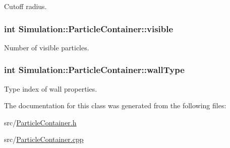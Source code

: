 Cutoff radius. 

\hypertarget{classSimulation_1_1ParticleContainer_a3e3805eea543d96c5cf6ced07b9c2e7b}{
\subsubsection[{visible}]{\setlength{\rightskip}{0pt plus 5cm}int Simulation\-::\-Particle\-Container\-::visible\hspace{0.3cm}{\ttfamily [private]}}}\label{classSimulation_1_1ParticleContainer_a3e3805eea543d96c5cf6ced07b9c2e7b}


Number of visible particles. 

\hypertarget{classSimulation_1_1ParticleContainer_a257c23a232693610d47c0ee082085a49}{
\subsubsection[{wall\-Type}]{\setlength{\rightskip}{0pt plus 5cm}int Simulation\-::\-Particle\-Container\-::wall\-Type\hspace{0.3cm}{\ttfamily [private]}}}\label{classSimulation_1_1ParticleContainer_a257c23a232693610d47c0ee082085a49}


Type index of wall properties. 



The documentation for this class was generated from the following files\-:\begin{DoxyCompactItemize}
\item 
src/\hyperlink{ParticleContainer_8h}{Particle\-Container.\-h}\item 
src/\hyperlink{ParticleContainer_8cpp}{Particle\-Container.\-cpp}\end{DoxyCompactItemize}
